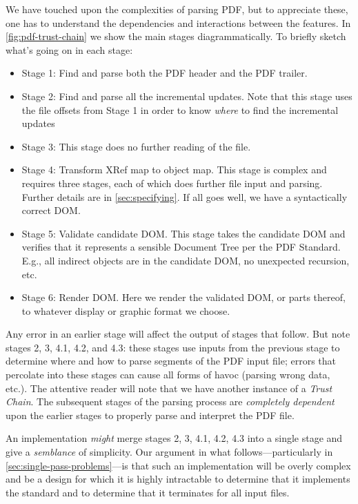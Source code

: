 We have touched upon the complexities of parsing
PDF, but to appreciate these, one has to understand the
dependencies and interactions between the features.
In \cref{fig:pdf-trust-chain} we show the main stages diagrammatically.
To briefly sketch what's going on in each stage:
\begin{itemize}
\item Stage 1: Find and parse both the PDF header and the PDF trailer.
\item Stage 2: Find and parse all the incremental updates.  Note that this stage
  uses the file offsets from Stage 1 in order to know \emph{where} to find the
  incremental updates
\item Stage 3: This stage does no further reading of the file.
\item Stage 4: Transform XRef map to object map. This stage is complex and
  requires three stages, each of which does further file input and parsing.
  Further details are in \cref{sec:specifying}.
  If all goes well, we have a syntactically correct DOM.
\item Stage 5: Validate candidate DOM.  This stage takes the candidate DOM and
  verifies that it represents a sensible Document Tree per the PDF Standard.
  E.g., all indirect objects are in the candidate DOM, no unexpected recursion,
  etc.
\item Stage 6: Render DOM.  Here we render the validated DOM, or parts thereof,
  to whatever display or graphic format we choose.
\end{itemize}

Any error in an earlier stage will affect the output of stages that follow.
But note stages 2, 3, 4.1, 4.2, and 4.3:
these stages use inputs from the previous stage to determine where and
how to parse segments of the PDF input file;
errors that percolate into these stages can
cause all forms of havoc (parsing wrong data, etc.).
%
The attentive reader will note that we have another instance of a \emph{Trust
Chain}.  The subsequent stages of the parsing process are \emph{completely
dependent} upon the earlier stages to properly parse and interpret the PDF
file.

An implementation \emph{might} merge stages 2, 3, 4.1, 4.2, 4.3 into
a single stage and give a \emph{semblance} of simplicity.
%
Our argument in what follows---particularly in
\cref{sec:single-pass-problems}---is
that such an implementation will be overly
complex and be a design for which it is highly intractable
to determine that it implements the standard
and to determine that it terminates for all input files.

